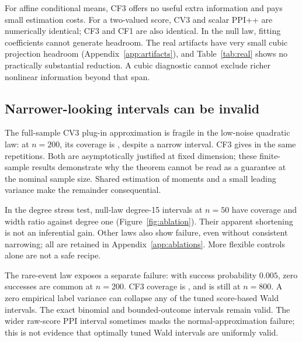 \documentclass{article}
\begin{document}
For affine conditional means, CF3 offers no useful extra information and pays small estimation costs. For a two-valued score, CV3 and scalar PPI++ are numerically identical; CF3 and CF1 are also identical. In the null law, fitting coefficients cannot generate headroom. The real artifacts have very small cubic projection headroom (Appendix~\ref{app:artifacts}), and Table~\ref{tab:real} shows no practically substantial reduction. A cubic diagnostic cannot exclude richer nonlinear information beyond that span.

\begin{table}[t]
 \caption{Real prediction artifacts, 5,000 IID empirical-distribution repetitions per row. Widths and ratios show paired/mean 95\% Monte Carlo error bars as appropriate; coverage errors are $1.96$ binomial standard errors. Full method comparisons and Wilson intervals appear in Appendix~\ref{app:full}.}
 \label{tab:real}\centering
 \resizebox{\linewidth}{!}{}
\end{table}

\subsection{Narrower-looking intervals can be invalid}
The full-sample CV3 plug-in approximation is fragile in the low-noise quadratic law: at $n=200$, its coverage is \NaiveQuadCoverage{}, despite a narrow interval. CF3 gives \SmallQuadCFCoverage{} in the same repetitions. Both are asymptotically justified at fixed dimension; these finite-sample results demonstrate why the theorem cannot be read as a guarantee at the nominal sample size. Shared estimation of moments and a small leading variance make the remainder consequential.

In the degree stress test, null-law degree-15 intervals at $n=50$ have coverage \HighDegreeCoverage{} and width ratio \HighDegreeRatio{} against degree one (Figure~\ref{fig:ablation}). Their apparent shortening is not an inferential gain. Other laws also show failure, even without consistent narrowing; all are retained in Appendix~\ref{app:ablations}. More flexible controls alone are not a safe recipe.

The rare-event law exposes a separate failure: with success probability $0.005$, zero successes are common at $n=200$. CF3 coverage is \RareSmallCoverage{}, and is still \RareLargeCoverage{} at $n=800$. A zero empirical label variance can collapse any of the tuned score-based Wald intervals. The exact binomial and bounded-outcome intervals remain valid. The wider raw-score PPI interval sometimes masks the normal-approximation failure; this is not evidence that optimally tuned Wald intervals are uniformly valid.
\end{document}
